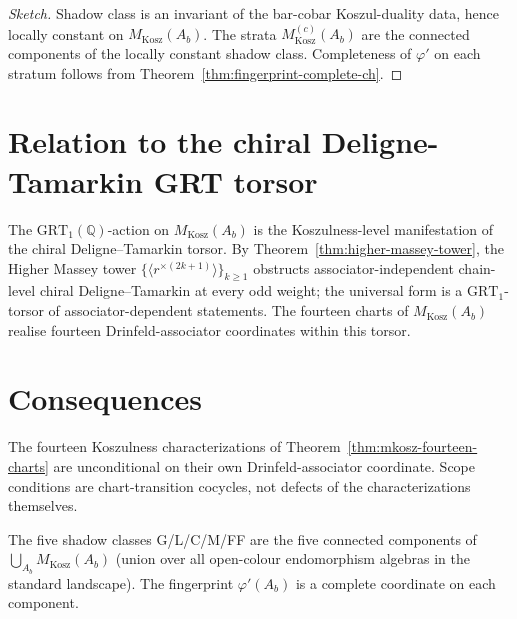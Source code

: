 \begin{proof}[Sketch]
Shadow class is an invariant of the bar-cobar Koszul-duality data,
hence locally constant on $M_{\mathrm{Kosz}}(A_b)$. The strata
$M_{\mathrm{Kosz}}^{(c)}(A_b)$ are the connected components of the
locally constant shadow class. Completeness of $\varphi'$ on each
stratum follows from Theorem~\ref{thm:fingerprint-complete-ch}.
\end{proof}

\section{Relation to the chiral Deligne-Tamarkin GRT torsor}
\label{sec:mkosz-grt-torsor}

\begin{remark}
The $\mathrm{GRT}_1(\mathbb{Q})$-action on $M_{\mathrm{Kosz}}(A_b)$ is the
Koszulness-level manifestation of the chiral Deligne--Tamarkin torsor.
By Theorem~\ref{thm:higher-massey-tower}, the Higher Massey tower
$\{\langle r^{\times(2k+1)}\rangle\}_{k \ge 1}$ obstructs
associator-independent chain-level chiral Deligne--Tamarkin at every odd
weight; the universal form is a $\mathrm{GRT}_1$-torsor of
associator-dependent statements. The fourteen charts of
$M_{\mathrm{Kosz}}(A_b)$ realise fourteen Drinfeld-associator coordinates
within this torsor.
\end{remark}

\section{Consequences}
\label{sec:mkosz-consequences}

\begin{corollary}
The fourteen Koszulness characterizations of
Theorem~\ref{thm:mkosz-fourteen-charts} are unconditional on their own
Drinfeld-associator coordinate. Scope conditions are chart-transition
cocycles, not defects of the characterizations themselves.
\end{corollary}

\begin{corollary}
The five shadow classes G/L/C/M/FF are the five connected components of
$\bigcup_{A_b} M_{\mathrm{Kosz}}(A_b)$ (union over all open-colour
endomorphism algebras in the standard landscape). The fingerprint
$\varphi'(A_b)$ is a complete coordinate on each component.
\end{corollary}

